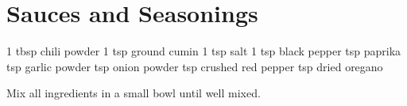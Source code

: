 \chapter{Sauces and Seasonings}

\begin{ingreds}
  1 tbsp chili powder
  1  tsp ground cumin
  1 tsp salt
  1 tsp black pepper
   tsp paprika
   tsp garlic powder
   tsp onion powder
   tsp crushed red pepper
   tsp dried oregano
\end{ingreds}

\begin{method}
Mix all ingredients in a small bowl until well mixed.
\end{method}

